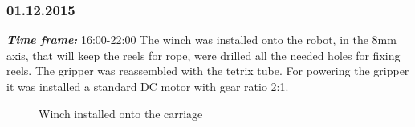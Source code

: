\subsubsection{01.12.2015}
\textit{\textbf{Time frame:}} 16:00-22:00 \newline
The winch was installed onto the robot, in the 8mm axis, that will keep the reels for rope, were drilled all the needed holes for fixing reels.
The gripper was reassembled with the tetrix tube. For powering the gripper it was installed a standard DC motor with gear ratio 2:1.

\begin{figure}[H]
	\begin{minipage}[h]{0.58\linewidth}
		\caption{Winch installed onto the carriage}
	\end{minipage}
	\hfill
	\begin{minipage}[h]{0.37\linewidth}

\end{minipage}
\end{figure}
